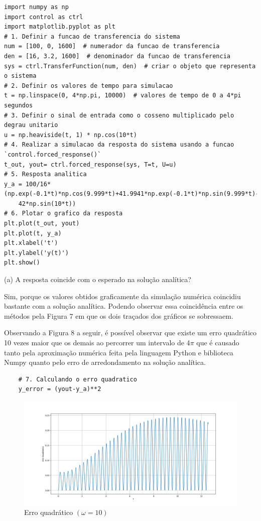 \documentclass[10pt]{article}
\begin{document}
\begin{lstlisting}
import numpy as np
import control as ctrl
import matplotlib.pyplot as plt
# 1. Definir a funcao de transferencia do sistema
num = [100, 0, 1600]  # numerador da funcao de transferencia
den = [16, 3.2, 1600]  # denominador da funcao de transferencia
sys = ctrl.TransferFunction(num, den)  # criar o objeto que representa o sistema
# 2. Definir os valores de tempo para simulacao
t = np.linspace(0, 4*np.pi, 10000)  # valores de tempo de 0 a 4*pi segundos
# 3. Definir o sinal de entrada como o cosseno multiplicado pelo degrau unitario
u = np.heaviside(t, 1) * np.cos(10*t)
# 4. Realizar a simulacao da resposta do sistema usando a funcao `control.forced_response()`
t_out, yout= ctrl.forced_response(sys, T=t, U=u)
# 5. Resposta analitica
y_a = 100/16*(np.exp(-0.1*t)*np.cos(9.999*t)+41.9941*np.exp(-0.1*t)*np.sin(9.999*t)-
    42*np.sin(10*t))
# 6. Plotar o grafico da resposta
plt.plot(t_out, yout)
plt.plot(t, y_a)
plt.xlabel('t')
plt.ylabel('y(t)')
plt.show()
\end{lstlisting}

(a) A resposta coincide com o esperado na solução analítica?

\quad Sim, porque os valores obtidos graficamente da simulação numérica coincidiu bastante com a solução analítica.
Podendo observar essa coincidência entre os métodos pela Figura 7 em que os dois traçados dos gráficos se sobressaem.

\quad Observando a Figura 8 a seguir, é possível observar que existe um erro quadrático 10 vezes maior que os demais
ao percorrer um intervalo de 4$\pi$ que é causado tanto pela aproximação numérica feita pela linguagem Python e biblioteca Numpy
quanto pelo erro de arredondamento na solução analítica.

\begin{lstlisting}
    # 7. Calculando o erro quadratico
    y_error = (yout-y_a)**2
\end{lstlisting}

\newpage

\begin{figure}[h]
    \centering
    \includegraphics[scale=0.4]{erro3.png}
    \caption{Erro quadrático $(\omega = 10)$}
\end{figure}
\end{document}
